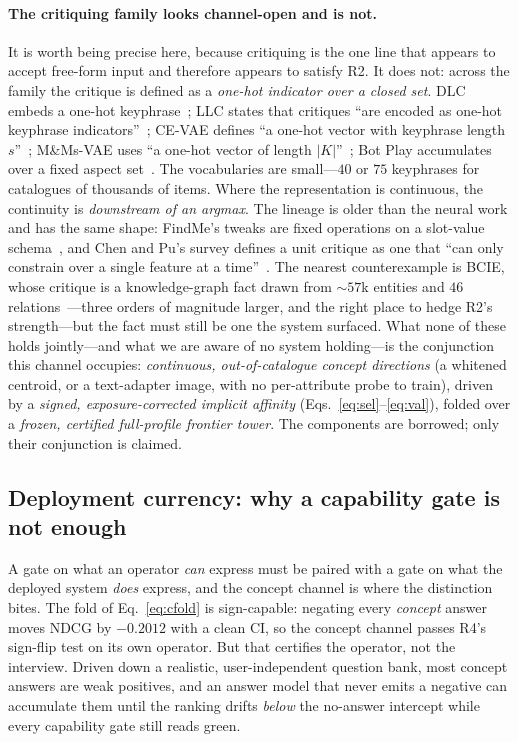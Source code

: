\documentclass[11pt]{article}
\begin{document}
\paragraph{The critiquing family looks channel-open and is not.} It is worth being precise here, because
critiquing is the one line that appears to accept free-form input and therefore appears to satisfy R2. It does
not: across the family the critique is defined as a \emph{one-hot indicator over a closed set}. DLC embeds a
one-hot keyphrase~\cite{wu2019dlc}; LLC states that critiques ``are encoded as one-hot keyphrase
indicators''~\cite{luo2020llc}; CE-VAE defines ``a one-hot vector with keyphrase length $s$''~\cite{luo2020cevae};
M\&Ms-VAE uses ``a one-hot vector of length $|K|$''~\cite{antognini2021mmvae}; Bot Play accumulates over a fixed
aspect set~\cite{li2021botplay}. The vocabularies are small---$40$ or $75$ keyphrases for catalogues of thousands
of items. Where the representation is continuous, the continuity is \emph{downstream of an argmax}. The lineage is
older than the neural work and has the same shape: FindMe's tweaks are fixed operations on a slot-value
schema~\cite{burke1996findme}, and Chen and Pu's survey defines a unit critique as one that ``can only constrain
over a single feature at a time''~\cite{chenpu2012critiquing}. The nearest counterexample is BCIE, whose critique
is a knowledge-graph fact drawn from $\sim$$57$k entities and $46$ relations~\cite{toroghi2023bcie}---three orders
of magnitude larger, and the right place to hedge R2's strength---but the fact must still be one the system
surfaced. What none of these holds jointly---and what we are aware of no system holding---is
the conjunction this channel occupies: \emph{continuous, out-of-catalogue concept directions} (a whitened centroid, or
a text-adapter image, with no per-attribute probe to train), driven by a \emph{signed, exposure-corrected implicit
affinity} (Eqs.~\eqref{eq:sel}--\eqref{eq:val}), folded over a \emph{frozen, certified full-profile frontier tower}. The
components are borrowed; only their conjunction is claimed.

\subsection{Deployment currency: why a capability gate is not enough}\label{sec:concept:fail}

A gate on what an operator \emph{can} express must be paired with a gate on what the deployed system
\emph{does} express, and the concept channel is where the distinction bites. The fold of
Eq.~\eqref{eq:cfold} is sign-capable: negating every \emph{concept} answer moves NDCG by $-0.2012$ with a
clean CI, so the concept channel passes R4's sign-flip test on its own operator. But that certifies the operator, not the interview. Driven down a
realistic, user-independent question bank, most concept answers are weak positives, and an answer model
that never emits a negative can accumulate them until the ranking drifts \emph{below} the no-answer
intercept while every capability gate still reads green.
\end{document}
